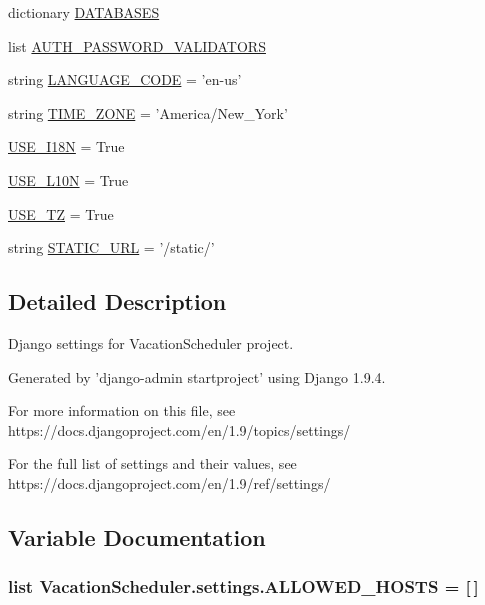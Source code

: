 \begin{DoxyCompactItemize}
dictionary \hyperlink{namespaceVacationScheduler_1_1settings_a2b465f83c1bf6c2459017cd34b78b07f}{D\-A\-T\-A\-B\-A\-S\-E\-S}
\item 
list \hyperlink{namespaceVacationScheduler_1_1settings_a8951ccc7a8fd315625233bdc964d1735}{A\-U\-T\-H\-\_\-\-P\-A\-S\-S\-W\-O\-R\-D\-\_\-\-V\-A\-L\-I\-D\-A\-T\-O\-R\-S}
\item 
string \hyperlink{namespaceVacationScheduler_1_1settings_a0d23e095276d91336cde84320fed122a}{L\-A\-N\-G\-U\-A\-G\-E\-\_\-\-C\-O\-D\-E} = 'en-\/us'
\item 
string \hyperlink{namespaceVacationScheduler_1_1settings_ad317c9bbe561a5d66045bc072cdf724d}{T\-I\-M\-E\-\_\-\-Z\-O\-N\-E} = 'America/New\-\_\-\-York'
\item 
\hyperlink{namespaceVacationScheduler_1_1settings_ad425eda1a47d223d12f91c591d99fce0}{U\-S\-E\-\_\-\-I18\-N} = True
\item 
\hyperlink{namespaceVacationScheduler_1_1settings_a1ebb32e4d2ecadff2efd497b6d64c125}{U\-S\-E\-\_\-\-L10\-N} = True
\item 
\hyperlink{namespaceVacationScheduler_1_1settings_ad3ca21478ba5c956be88507ad1cf40bf}{U\-S\-E\-\_\-\-T\-Z} = True
\item 
string \hyperlink{namespaceVacationScheduler_1_1settings_a815e6fde1e46d971b44b315d794ce944}{S\-T\-A\-T\-I\-C\-\_\-\-U\-R\-L} = '/static/'
\end{DoxyCompactItemize}


\subsection{Detailed Description}
\begin{DoxyVerb}Django settings for VacationScheduler project.

Generated by 'django-admin startproject' using Django 1.9.4.

For more information on this file, see
https://docs.djangoproject.com/en/1.9/topics/settings/

For the full list of settings and their values, see
https://docs.djangoproject.com/en/1.9/ref/settings/
\end{DoxyVerb}
 

\subsection{Variable Documentation}
\hypertarget{namespaceVacationScheduler_1_1settings_ad2eb9be385a19e65d0c1095578626e3f}{
\subsubsection[{A\-L\-L\-O\-W\-E\-D\-\_\-\-H\-O\-S\-T\-S}]{\setlength{\rightskip}{0pt plus 5cm}list Vacation\-Scheduler.\-settings.\-A\-L\-L\-O\-W\-E\-D\-\_\-\-H\-O\-S\-T\-S = \mbox{[}$\,$\mbox{]}}}\label{namespaceVacationScheduler_1_1settings_ad2eb9be385a19e65d0c1095578626e3f}


